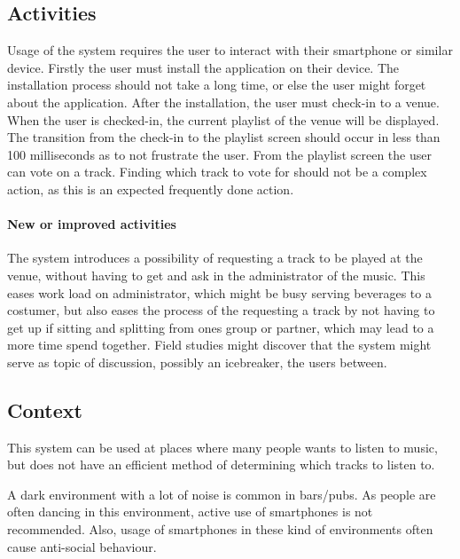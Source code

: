 \subsection{Activities}
\label{sub:pact_activities}

Usage of the system requires the user to interact with their smartphone or similar device. Firstly the user must install the application on their device. The installation process should not take a long time, or else the user might forget about the application. After the installation, the user must check-in to a venue.  When the user is checked-in, the current playlist of the venue will be displayed. The transition from the check-in to the playlist screen should occur in less than 100 milliseconds as to not frustrate the user. From the playlist screen the user can vote on a track. Finding which track to vote for should not be a complex action, as this is an expected frequently done action.

\paragraph{New or improved activities}
The system introduces a possibility of requesting a track to be played at the venue, without having to get and ask in the administrator of the music. This eases work load on administrator, which might be busy serving beverages to a costumer, but also eases the process of the requesting a track by not having to get up if sitting and splitting from ones group or partner, which may lead to a more time spend together. Field studies might discover that the system might serve as topic of discussion, possibly an icebreaker, the users between. 

\subsection{Context}
\label{sub:pact_context}

This system can be used at places where many people wants to listen to music, but does not have an efficient method  of determining which tracks to listen to.

A dark environment with a lot of noise is common in bars/pubs. As people are often dancing in this environment, active use of smartphones is not recommended. Also, usage of smartphones in these kind of environments often cause anti-social behaviour. 

